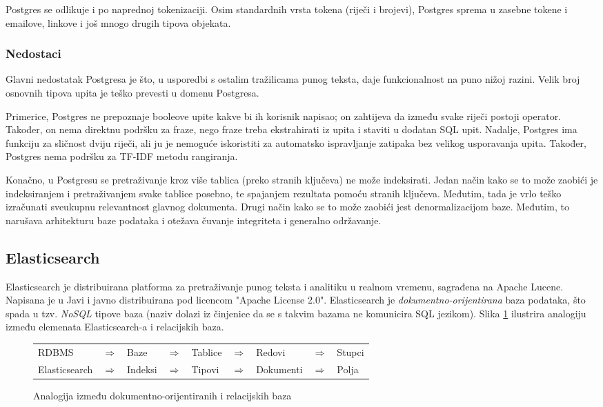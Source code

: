 \documentclass[a4paper,twoside,12pt]{scrreprt}
\begin{document}
Postgres se odlikuje i po naprednoj tokenizaciji. Osim standardnih vrsta tokena (riječi i brojevi), Postgres sprema u zasebne tokene i emailove, linkove i još mnogo drugih tipova objekata.

\subsubsection{Nedostaci}

Glavni nedostatak Postgresa je što, u usporedbi s ostalim tražilicama punog teksta, daje funkcionalnost na puno nižoj razini. Velik broj osnovnih tipova upita je teško prevesti u domenu Postgresa.

Primerice, Postgres ne prepoznaje booleove upite kakve bi ih korisnik napisao; on zahtijeva da između svake riječi postoji operator. Također, on nema direktnu podršku za fraze, nego fraze treba ekstrahirati iz upita i staviti u dodatan SQL upit. Nadalje, Postgres ima funkciju za sličnost dviju riječi, ali ju je nemoguće iskoristiti za automatsko ispravljanje zatipaka bez velikog usporavanja upita. Također, Postgres nema podršku za TF-IDF metodu rangiranja.

Konačno, u Postgresu se pretraživanje kroz više tablica (preko stranih ključeva) ne može indeksirati. Jedan način kako se to može zaobići je indeksiranjem i pretraživanjem svake tablice posebno, te spajanjem rezultata pomoću stranih ključeva. Međutim, tada je vrlo teško izračunati sveukupnu relevantnost glavnog dokumenta. Drugi način kako se to može zaobići jest denormalizacijom baze. Međutim, to narušava arhitekturu baze podataka i otežava čuvanje integriteta i generalno održavanje.

\subsection{Elasticsearch}

Elasticsearch je distribuirana platforma za pretraživanje punog teksta i analitiku u realnom vremenu, sagrađena na Apache Lucene. Napisana je u Javi i javno distribuirana pod licencom "Apache License 2.0". Elasticsearch je \textit{dokumentno-orijentirana} baza podataka, što spada u tzv. \textit{NoSQL} tipove baza (naziv dolazi iz činjenice da se s takvim bazama ne komunicira SQL jezikom). Slika \ref{elasticsearch} ilustrira analogiju između elemenata Elasticsearch-a i relacijskih baza.

\begin{figure}[H]
  \centering
  \begin{tabular}{lllllllll}
    RDBMS         & $\Rightarrow$ & Baze    & $\Rightarrow$ & Tablice & $\Rightarrow$ & Redovi    & $\Rightarrow$ & Stupci \\
    Elasticsearch & $\Rightarrow$ & Indeksi & $\Rightarrow$ & Tipovi  & $\Rightarrow$ & Dokumenti & $\Rightarrow$ & Polja  \\
  \end{tabular}
  \caption{Analogija između dokumentno-orijentiranih i relacijskih baza}
  \label{elasticsearch}
\end{figure}
\end{document}

